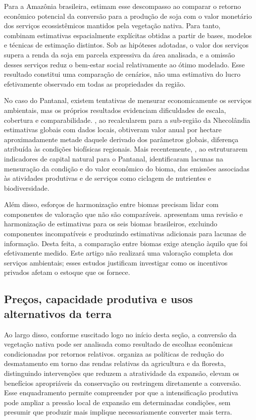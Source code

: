 Para a Amazônia brasileira,  estimam esse descompasso ao comparar o retorno econômico potencial da conversão para a produção de soja com o valor monetário dos serviços ecossistêmicos mantidos pela vegetação nativa. Para tanto, combinam estimativas espacialmente explícitas obtidas a partir de bases, modelos e técnicas de estimação distintos. Sob as hipóteses adotadas, o valor dos serviços supera a renda da soja em parcela expressiva da área analisada, e a omissão desses serviços reduz o bem-estar social relativamente ao ótimo modelado. Esse resultado constitui uma comparação de cenários, não uma estimativa do lucro efetivamente observado em todas as propriedades da região.

No caso do Pantanal, existem tentativas de mensurar economicamente os serviços ambientais, mas os próprios resultados evidenciam dificuldades de escala, cobertura e comparabilidade. , ao recalcularem para a sub-região da Nhecolândia estimativas globais com dados locais, obtiveram valor anual por hectare aproximadamente metade daquele derivado dos parâmetros globais, diferença atribuída às condições biofísicas regionais. Mais recentemente, , ao estruturarem indicadores de capital natural para o Pantanal, identificaram lacunas na mensuração da condição e do valor econômico do bioma, das emissões associadas às atividades produtivas e de serviços como ciclagem de nutrientes e biodiversidade.

Além disso, esforços de harmonização entre biomas precisam lidar com componentes de valoração que não são comparáveis.  apresentam uma revisão e harmonização de estimativas para os seis biomas brasileiros, excluindo componentes incompatíveis e produzindo estimativas adicionais para lacunas de informação. Desta feita, a comparação entre biomas exige atenção àquilo que foi efetivamente medido. Este artigo não realizará uma valoração completa dos serviços ambientais; esses estudos justificam investigar como os incentivos privados afetam o estoque que os fornece.

\subsection{Preços, capacidade produtiva e usos alternativos da terra}

Ao largo disso, conforme suscitado logo no início desta seção, a conversão da vegetação nativa pode ser analisada como resultado de escolhas econômicas condicionadas por retornos relativos.  organiza as políticas de redução do desmatamento em torno das rendas relativas da agricultura e da floresta, distinguindo intervenções que reduzem a atratividade da expansão, elevam os benefícios apropriáveis da conservação ou restringem diretamente a conversão. Esse enquadramento permite compreender por que a intensificação produtiva pode ampliar a pressão local de expansão em determinadas condições, sem presumir que produzir mais implique necessariamente converter mais terra.

